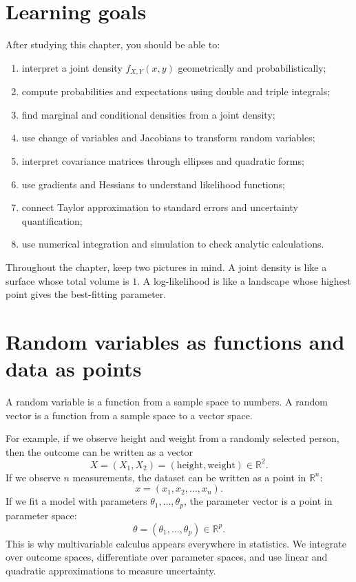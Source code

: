 \documentclass[11pt,oneside]{book}
\newcommand{\R}{\mathbb R}
\begin{document}
\section*{Learning goals}
After studying this chapter, you should be able to:
\begin{enumerate}
  \item interpret a joint density $f_{X,Y}(x,y)$ geometrically and probabilistically;
  \item compute probabilities and expectations using double and triple integrals;
  \item find marginal and conditional densities from a joint density;
  \item use change of variables and Jacobians to transform random variables;
  \item interpret covariance matrices through ellipses and quadratic forms;
  \item use gradients and Hessians to understand likelihood functions;
  \item connect Taylor approximation to standard errors and uncertainty quantification;
  \item use numerical integration and simulation to check analytic calculations.
\end{enumerate}

Throughout the chapter, keep two pictures in mind. A joint density is like a surface whose total volume is $1$. A log-likelihood is like a landscape whose highest point gives the best-fitting parameter.

\section{Random variables as functions and data as points}

A random variable is a function from a sample space to numbers. A random vector is a function from a sample space to a vector space.

For example, if we observe height and weight from a randomly selected person, then the outcome can be written as a vector
\[
X=(X_1,X_2)=(\text{height},\text{weight})\in\R^2.
\]
If we observe $n$ measurements, the dataset can be written as a point in $\R^n$:
\[
x=(x_1,x_2,\ldots,x_n).
\]
If we fit a model with parameters $\theta_1,\ldots,\theta_p$, the parameter vector is a point in parameter space:
\[
\theta=(\theta_1,\ldots,\theta_p)\in\R^p.
\]
This is why multivariable calculus appears everywhere in statistics. We integrate over outcome spaces, differentiate over parameter spaces, and use linear and quadratic approximations to measure uncertainty.
\end{document}
